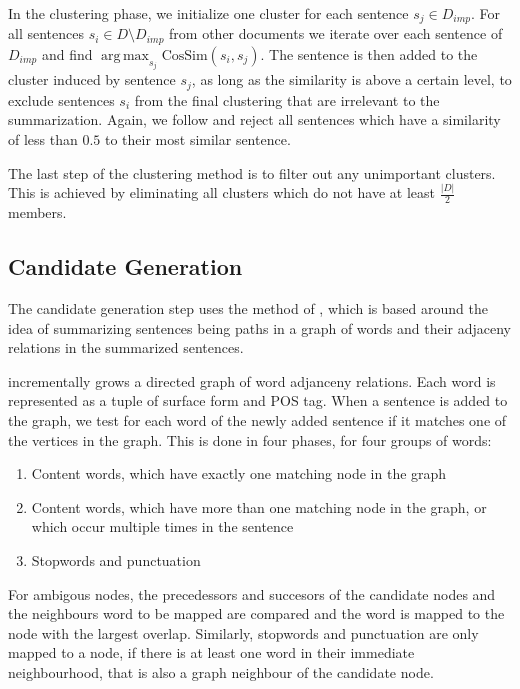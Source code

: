 \documentclass[a4paper,BCOR=10mm]{report}
\DeclareMathOperator*{\argmax}{arg\,max}
\begin{document}
In the clustering phase, we initialize one cluster for each sentence $s_j \in D_{imp}$. For all sentences $s_i \in D \setminus D_{imp}$ from other documents we iterate over each sentence of $D_{imp}$ and find $\argmax_{s_j} \text{CosSim}(s_i, s_j)$. The sentence is then added to the cluster induced by sentence $s_j$, as long as the similarity is above a certain level, to exclude sentences $s_i$ from the final clustering that are irrelevant to the summarization.
Again, we follow \citeauthor{banerjee} and reject all sentences which have a similarity of less than $0.5$ to their most similar sentence.

The last step of the clustering method is to filter out any unimportant clusters. This is achieved by eliminating all clusters which do not have at least $\frac{|D|}{2}$ members.


\subsection{Candidate Generation}

The candidate generation step uses the method of \citet{fillipova}, which is based around the idea of summarizing sentences being paths in a graph of words and their adjaceny relations in the summarized sentences.

\citeauthor{fillipova} incrementally grows a directed graph of word adjanceny relations. Each word is represented as a tuple of surface form and POS tag. When a sentence is added to the graph, we test for each word of the newly added sentence if it matches one of the vertices in the graph. This is done in four phases, for four groups of words:

\begin{enumerate}
\item{Content words, which have exactly one matching node in the graph}
\item{Content words, which have more than one matching node in the graph, or which occur multiple times in the sentence}
\item{Stopwords and punctuation} %
\end{enumerate}

For ambigous nodes, the precedessors and succesors of the candidate nodes and the neighbours word to be mapped are compared and the word is mapped to the node with the largest overlap.
Similarly, stopwords and punctuation are only mapped to a node, if there is at least one word in their immediate neighbourhood, that is also a graph neighbour of the candidate node.
\end{document}
